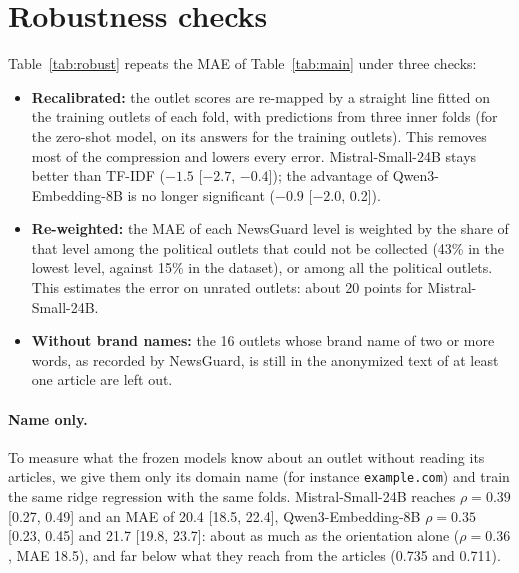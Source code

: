 \documentclass[11pt,a4paper]{article}
\begin{document}
\section{Robustness checks}\label{app:robust}
Table~\ref{tab:robust} repeats the MAE of Table~\ref{tab:main} under three checks:
\begin{itemize}
  \item \textbf{Recalibrated:} the outlet scores are re-mapped by a straight line fitted on the training outlets of each
        fold, with predictions from three inner folds (for the zero-shot model, on its answers for the training
        outlets). This removes most of the compression and lowers every error. Mistral-Small-24B stays better than
        TF-IDF ($-1.5$ [$-2.7$, $-0.4$]); the advantage of Qwen3-Embedding-8B is no longer significant ($-0.9$ [$-2.0$,
        0.2]).
  \item \textbf{Re-weighted:} the MAE of each NewsGuard level is weighted by the share of that level among the
        political outlets that could not be collected (43\% in the lowest level, against 15\% in the dataset), or among
        all the political outlets. This estimates the error on unrated outlets: about 20 points for Mistral-Small-24B.
  \item \textbf{Without brand names:} the 16 outlets whose brand name of two or more words, as recorded by NewsGuard, is
        still in the anonymized text of at least one article are left out.
\end{itemize}

\paragraph{Name only.} To measure what the frozen models know about an outlet without reading its articles, we give them
only its domain name (for instance \texttt{example.com}) and train the same ridge regression with the same folds.
Mistral-Small-24B reaches $\rho = 0.39$ [0.27, 0.49] and an MAE of 20.4 [18.5, 22.4], Qwen3-Embedding-8B $\rho = 0.35$
[0.23, 0.45] and 21.7 [19.8, 23.7]: about as much as the orientation alone ($\rho = 0.36$, MAE 18.5), and far below what
they reach from the articles (0.735 and 0.711).
\end{document}
